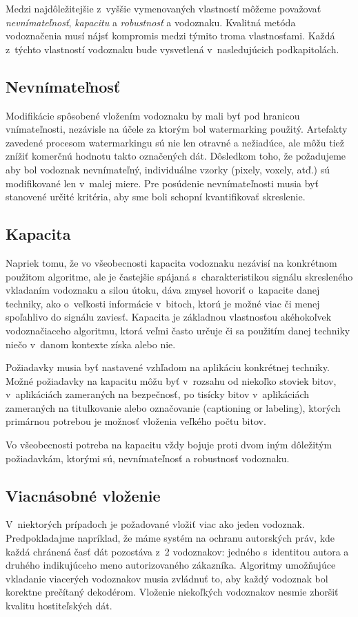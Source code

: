 Medzi najdôležitejšie z~vyššie vymenovaných vlastností môžeme považovať {\it nevnímateľnosť}, {\it kapacitu} a {\it robustnosť} a vodoznaku. Kvalitná metóda vodoznačenia musí nájsť kompromis medzi týmito troma vlastnosťami. Každá z~týchto vlastností vodoznaku bude vysvetlená v~nasledujúcich podkapitolách.

\subsection{Nevnímateľnosť}
Modifikácie spôsobené vložením vodoznaku by mali byť pod hranicou vnímateľnosti, nezávisle na účele za ktorým bol watermarking použitý. Artefakty zavedené procesom watermarkingu sú nie len otravné a nežiadúce, ale môžu tiež znížiť komerčnú hodnotu takto označených dát. Dôsledkom toho, že požadujeme aby bol vodoznak nevnímateľný, individuálne vzorky (pixely, voxely, atď.) sú modifikované len v~malej miere. Pre posúdenie nevnímateľnosti musia byť stanovené určité kritéria, aby sme boli schopní kvantifikovať skreslenie. \cite{Katzenbeisser}

\subsection{Kapacita}
Napriek tomu, že vo všeobecnosti kapacita vodoznaku nezávisí na konkrétnom použitom algoritme, ale je častejšie spájaná s~charakteristikou signálu skresleného vkladaním vodoznaku a silou útoku, dáva zmysel hovoriť o~kapacite danej techniky, ako o~veľkosti informácie v~bitoch, ktorú je možné viac či menej spoľahlivo do signálu zaviesť.
Kapacita je základnou vlastnosťou akéhokoľvek vodoznačiaceho algoritmu, ktorá veľmi často určuje či sa použitím danej techniky niečo v~danom kontexte získa alebo nie.

Požiadavky musia byť nastavené vzhľadom na aplikáciu konkrétnej techniky. Možné požiadavky na kapacitu môžu byť v~rozsahu od niekoľko stoviek bitov, v~aplikáciách zameraných na bezpečnosť, po tisícky bitov v~aplikáciách zameraných na titulkovanie alebo označovanie (captioning or labeling), ktorých primárnou potrebou je možnosť vloženia veľkého počtu bitov.

Vo všeobecnosti potreba na kapacitu vždy bojuje proti dvom iným dôležitým požiadavkám, ktorými sú, nevnímateľnosť a robustnosť vodoznaku. \cite{Barni}

\subsection{Viacnásobné vloženie}
V~niektorých prípadoch je požadované vložiť viac ako jeden vodoznak. Predpokladajme napríklad, že máme systém na ochranu autorských práv, kde každá chránená časť dát pozostáva z~2 vodoznakov: jedného s~identitou autora a druhého indikujúceho meno autorizovaného zákazníka. Algoritmy umožňujúce vkladanie viacerých vodoznakov musia zvládnuť to, aby každý vodoznak bol korektne prečítaný dekodérom. Vloženie niekoľkých vodoznakov nesmie zhoršiť kvalitu hostiteľských dát. \cite{Barni}
